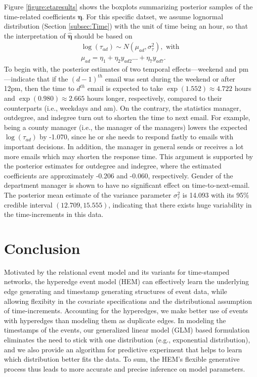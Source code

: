 \documentclass[ba]{imsart}
\numberwithin{equation}{section}
\theoremstyle{plain}
\begin{document}
	Figure \ref{figure:etaresults} shows the boxplots summarizing posterior samples of the time-related coefficients $\boldsymbol{\eta}$. For this specific datset, we assume lognormal distribution (Section \ref{subsec:Time}) with the unit of time being an hour, so that the interpretation of $\hat{\boldsymbol{\eta}}$ should be based on
	\begin{equation*}
	\begin{aligned}
	&\log(\tau_{ad}) \sim N(\mu_{ad}, \sigma_\tau^2), \mbox{ with }\\
	&\mu_{ad} = \eta_{1}+\eta_{2} y_{ad2}\ldots+\eta_{7}y_{ad7}.
	\end{aligned}
	\end{equation*}
	To begin with, the posterior estimates of two temporal effects---weekend and pm---indicate that if the ${(d-1)}^{th}$ email was sent during the weekend or after 12pm, then the time to $d^{th}$ email is expected to take $\exp(1.552)\approx 4.722$ hours and $\exp(0.980)\approx2.665$ hours longer, respectively, compared to their counterparts (i.e., weekdays and am). On the contrary, the statistics manager, outdegree, and indegree turn out to shorten the time to next email. For example, being a county manager (i.e., the manager of the managers) lowers the expected $\log(\tau_{ad})$ by -1.070, since he or she needs to respond fastly to emails with important decisions. In addition, the manager in general sends or receives a lot more emails which may shorten the response time. This argument is supported by the posterior estimates for outdegree and indegree, where the estimated coefficients are approximately -0.206 and -0.060, respectively. Gender of the department manager is shown to have no significant effect on time-to-next-email. The posterior mean estimate of the variance parameter $\sigma^2_\tau$ is 14.093 with its 95\% credible interval $(12.709, 15.555)$, indicating that there exists huge variability in the time-increments in this data.
	
\section{Conclusion}\label{sec:conclusion}
Motivated by the relational event model \citep{Butts2008} and its variants for time-stamped networks, the hyperedge event model (HEM) can effectively learn the underlying edge generating and timestamp generating structures of event data, while allowing flexibity in the covariate specifications and the distributional assumption of time-increments.
Accounting for the hyperedges, we make better use of events with hyperedges than modeling them as duplicate edges. In modeling the timestamps of the events, our generalized linear model (GLM) based formulation eliminates the need to stick with one distribution (e.g., exponential distribution), and we also provide an algorithm for predictive experiment that helps to learn which distribution better fits the data. To sum, the HEM's flexible generative process thus leads to more accurate and precise inference on model parameters.
\end{document}
